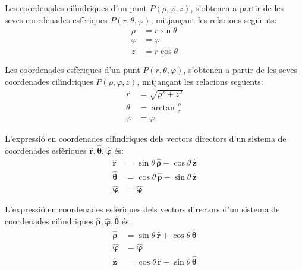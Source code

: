 \documentclass[catalan,a4paper,twoside,11pt]{article}
\begin{document}
Les coordenades cil\'{\i}ndriques  d'un punt $P(\rho,\varphi,z)$,
s'obtenen a partir de les seves coordenades esf\`{e}riques
$P(r,\theta,\varphi)$, mitjan\c{c}ant les relacions seg\"{u}ents:
\begin{subequations}\begin{align}
    \rho &=r\sin\theta \\ \varphi &=\varphi \\z &=r\cos\theta
\end{align}\end{subequations}

Les coordenades  esf\`{e}riques  d'un punt $P(r,\theta,\varphi)$,
s'obtenen a partir de les seves coordenades cil\'{\i}ndriques
$P(\rho,\varphi,z)$, mitjan\c{c}ant les relacions seg\"{u}ents:
\begin{subequations}\begin{align}
    r &=\sqrt{\rho^2+z^2}\\
    \theta &=\arctan\frac{\rho}{z}\\
    \varphi &=\varphi
\end{align}\end{subequations}

L'expressi\'{o} en coordenades cil\'{\i}ndriques dels vectors directors d'un sistema de coordenades  esf\`{e}riques $\boldsymbol{\hat{r}},\boldsymbol{\hat{\theta}},\boldsymbol{\hat{\varphi}}$ \'{e}s:
\begin{subequations}\begin{align}
    \boldsymbol{\hat{r}} &=\sin\theta\,\boldsymbol{\hat{\rho}}+\cos\theta\,\boldsymbol{\hat{z}}\\
    \boldsymbol{\hat{\theta}}
    &=\cos\theta\,\boldsymbol{\hat{\rho}}-\sin\theta\,\boldsymbol{\hat{z}}\\
    \boldsymbol{\hat{\varphi}}&=\boldsymbol{\hat{\varphi}}
\end{align}\end{subequations}

L'expressi\'{o} en coordenades esf\`{e}riques dels vectors directors d'un sistema de coordenades  cil\'{\i}ndriques $\boldsymbol{\hat{\rho}},\boldsymbol{\hat{\varphi}},\boldsymbol{\hat{\theta}}$ \'{e}s:
\begin{subequations}\begin{align}
    \boldsymbol{\hat{\rho}} &=\sin\theta\,\boldsymbol{\hat{r}}+
    \cos\theta\,\boldsymbol{\hat{\theta}}\\
    \boldsymbol{\hat{\varphi}}&=\boldsymbol{\hat{\varphi}}\\
    \boldsymbol{\hat{z}} &=\cos\theta\,\boldsymbol{\hat{r}}-
    \sin\theta\,\boldsymbol{\hat{\theta}}
\end{align}\end{subequations}
\end{document}
